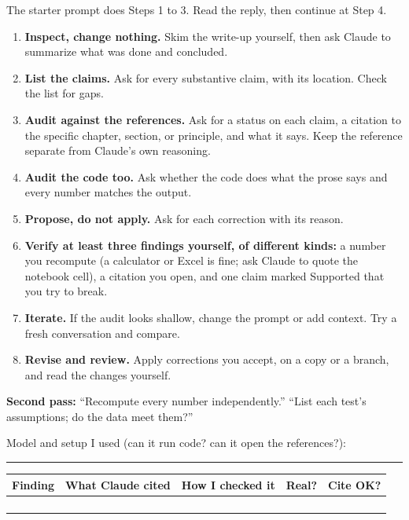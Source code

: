 \par{}\hfill{\small The starter prompt does Steps 1 to 3. Read the reply, then continue at Step 4.}\par
\begin{enumerate}[itemsep=1pt]
\item \textbf{Inspect, change nothing.} Skim the write-up yourself, then ask Claude to summarize what was done and concluded.
\item \textbf{List the claims.} Ask for every substantive claim, with its location. Check the list for gaps.
\item \textbf{Audit against the references.} Ask for a status on each claim, a citation to the specific chapter, section, or principle, and what it says. Keep the reference separate from Claude's own reasoning.
\item \textbf{Audit the code too.} Ask whether the code does what the prose says and every number matches the output.
\item \textbf{Propose, do not apply.} Ask for each correction with its reason.
\item \textbf{Verify at least three findings yourself, of different kinds:} a number you recompute (a calculator or Excel is fine; ask Claude to quote the notebook cell), a citation you open, and one claim marked Supported that you try to break.
\item \textbf{Iterate.} If the audit looks shallow, change the prompt or add context. Try a fresh conversation and compare.
\item \textbf{Revise and review.} Apply corrections you accept, on a copy or a branch, and read the changes yourself.
\end{enumerate}

\textbf{Second pass:} ``Recompute every number independently.'' ``List each test's assumptions; do the data meet them?''

Model and setup I used (can it run code? can it open the references?): \rule[-2pt]{2.6in}{0.4pt}\par\vspace{2pt}
\renewcommand{\arraystretch}{1.5}
\begin{tabularx}{\linewidth}{|>{\raggedright\arraybackslash}p{1.25in}|X|X|p{0.6in}|p{0.6in}|}
\hline
\small\textbf{Finding} & \small\textbf{What Claude cited} & \small\textbf{How I checked it} & \small\textbf{Real?} & \small\textbf{Cite OK?}\\
\hline
 & & & & \\ \hline
 & & & & \\ \hline
 & & & & \\ \hline
 & & & & \\ \hline
\end{tabularx}

